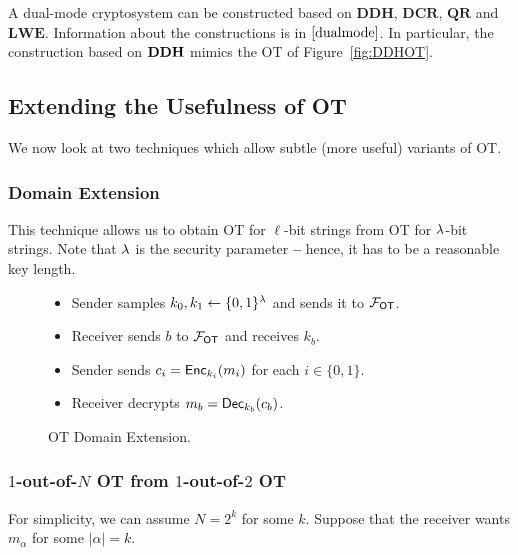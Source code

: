 A dual-mode cryptosystem can be constructed based on $\mathbf{DDH}$, $\mathbf{DCR}$, $\mathbf{QR}$ and $\mathbf{LWE}$. Information about the constructions is in $\cite{dualmode}$. In particular, the construction based on $\mathbf{DDH}$ mimics the OT of Figure~\ref{fig:DDHOT}.

\subsection{Extending the Usefulness of OT}

We now look at two techniques which allow subtle (more useful) variants of OT.

\subsubsection{Domain Extension} This technique allows us to obtain OT for $\ell$-bit strings from OT for $\lambda$-bit strings. Note that $\lambda$ is the security parameter \textbf{--} hence, it has to be a reasonable key length.

\begin{figure}[h]
	\begin{mdframed}[
		linecolor=black,
		linewidth=1pt,
		roundcorner=5pt,
		backgroundcolor=white,
		userdefinedwidth=\textwidth,
		]
		\vspace{2mm}
		\begin{itemize}
			\item Sender samples $k_0, k_1\gets\{0,1\}^\lambda$ and sends it to $\mathcal{F}_\mathsf{OT}$.
			\item Receiver sends $b$ to $\mathcal{F}_\mathsf{OT}$ and receives $k_b$.
			\item Sender sends $c_i = \mathsf{Enc}_{k_i}(m_i)$ for each $i\in\{0,1\}.$
			\item Receiver decrypts $m_b = \mathsf{Dec}_{k_b}(c_b)$.
		\end{itemize}
		\vspace{2mm}
	\end{mdframed}
	\caption{OT Domain Extension.}
	\label{fig:OTDomainExtension}
\end{figure}

\subsubsection{$1$-out-of-$N$ OT from $1$-out-of-$2$ OT}

For simplicity, we can assume $N=2^k$ for some $k$. Suppose that the receiver wants $m_\alpha$ for some $|\alpha|=k$.


